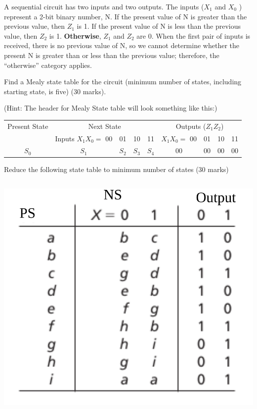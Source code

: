 \begin{prob}
  A sequential circuit has two inputs and two outputs. The inputs ($X_1$ and $X_0$ ) represent a 2-bit binary number, N. If the present value of N is greater than the previous value, then $Z_1$ is 1. If the present value of N is less than the previous value, then $Z_2$ is 1. \textbf{Otherwise}, $Z_1$ and $Z_2$ are 0. When the first pair of inputs is received, there is no previous value of N, so we cannot determine whether the present N is greater than or less than the previous value; therefore, the “otherwise” category applies.

Find a Mealy state table for the circuit (minimum number of states, including starting state, is five) (30 marks).
\label{p:fsm}
\end{prob}
(Hint: The header for Mealy State table will look something like this:)\\
\begin{tabular}{c|c|c|c|c|c|c|c|c}
  \toprule
  Present State & \multicolumn{4}{c|}{ Next State} & \multicolumn{4}{c}{Outputs ($Z_1 Z_2$)} \\
                & Inputs $X_1X_0=$ 00 & 01 & 10 & 11 & $X_1X_0=$ 00 & 01 & 10 & 11 \\
  \midrule
  $S_0$  & $S_1$ & $S_2$ & $S_3$ & $S_4$ & 00 & 00 & 00 & 00 \\
\end{tabular}

\begin{prob}
  Reduce the following state table to minimum number of states (30 marks)\\
  \begin{tabular}{c|cc|cc}
  \end{tabular}
  \includegraphics[width=0.3\linewidth]{./fig/15.15-state-table.png}
  \label{p:state-reduction}
\end{prob}

